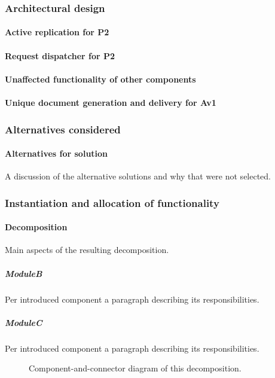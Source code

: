 \documentclass[a4paper,10pt]{article}
\begin{document}
\subsubsection{Architectural design}
\paragraph{Active replication for P2}


\paragraph{Request dispatcher for P2}


\paragraph{Unaffected functionality of other components}


\paragraph{Unique document generation and delivery for Av1}


\subsubsection*{Alternatives considered}
\paragraph{Alternatives for solution}
A discussion of the alternative solutions and why that were not selected.

\subsubsection{Instantiation and allocation of functionality}
\paragraph{Decomposition}
Main aspects of the resulting decomposition.

\subparagraph{ModuleB}
Per introduced component a paragraph describing its responsibilities.

\subparagraph{ModuleC}
Per introduced component a paragraph describing its responsibilities.

\begin{figure}[!htp]
	\centering
	\caption{Component-and-connector diagram of this decomposition.
	}\label{fig:it1-cc_main}
\end{figure}
\end{document}
